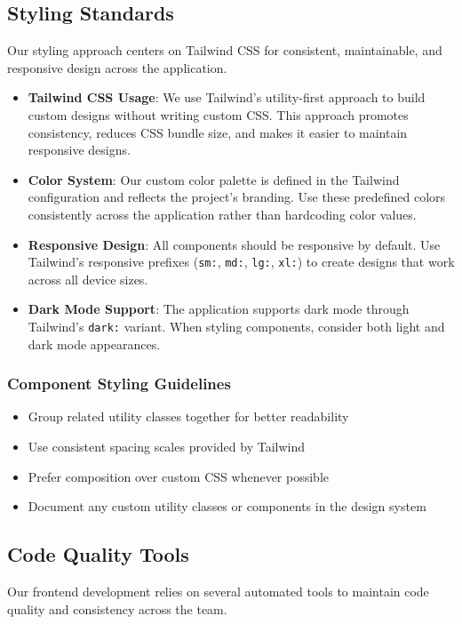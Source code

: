 \documentclass[12pt]{article}
\begin{document}
\subsection{Styling Standards}
Our styling approach centers on Tailwind CSS for consistent, maintainable, and responsive design across the application.

\begin{itemize}
    \item \textbf{Tailwind CSS Usage}: We use Tailwind's utility-first approach to build custom designs without writing custom CSS. This approach promotes consistency, reduces CSS bundle size, and makes it easier to maintain responsive designs.
    
    \item \textbf{Color System}: Our custom color palette is defined in the Tailwind configuration and reflects the project's branding. Use these predefined colors consistently across the application rather than hardcoding color values.
    
    \item \textbf{Responsive Design}: All components should be responsive by default. Use Tailwind's responsive prefixes (\texttt{sm:}, \texttt{md:}, \texttt{lg:}, \texttt{xl:}) to create designs that work across all device sizes.
    
    \item \textbf{Dark Mode Support}: The application supports dark mode through Tailwind's \texttt{dark:} variant. When styling components, consider both light and dark mode appearances.
\end{itemize}

\subsubsection{Component Styling Guidelines}
\begin{itemize}
    \item Group related utility classes together for better readability
    \item Use consistent spacing scales provided by Tailwind
    \item Prefer composition over custom CSS whenever possible
    \item Document any custom utility classes or components in the design system
\end{itemize}

\subsection{Code Quality Tools}
Our frontend development relies on several automated tools to maintain code quality and consistency across the team.
\end{document}
